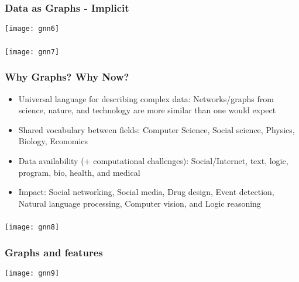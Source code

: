 \begin{frame}[fragile]\frametitle{Data as Graphs - Implicit }

\begin{center}
\texttt{[image: gnn6]}
\end{center}	  

\end{frame}

\begin{frame}[fragile]\frametitle{}

\begin{center}
\texttt{[image: gnn7]}
\end{center}	  

\end{frame}

\begin{frame}[fragile]\frametitle{Why Graphs? Why Now?}

\begin{itemize}
\item Universal language for describing complex data: Networks/graphs from science, nature, and technology are more similar than one would expect
\item Shared vocabulary between fields: Computer Science, Social science, Physics, Biology, Economics 
\item Data availability (+ computational challenges): Social/Internet, text, logic, program, bio, health, and medical
\item Impact: Social networking, Social media, Drug design, Event detection, Natural language processing, Computer vision, and Logic reasoning
\end{itemize}

\end{frame}


\begin{frame}[fragile]\frametitle{}

\begin{center}
\texttt{[image: gnn8]}
\end{center}	  

\end{frame}

\begin{frame}[fragile]\frametitle{Graphs and features}

\begin{center}
\texttt{[image: gnn9]}
\end{center}	  

\end{frame}

